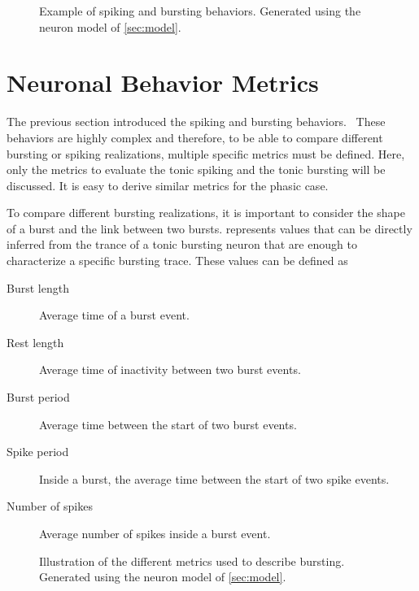 \begin{figure}[htb]
    \centering
    \caption{Example of spiking and bursting behaviors. Generated using the neuron model of \cref{sec:model}.}
    \label{fig:behaviors}
\end{figure}

\section{Neuronal Behavior Metrics}

The previous section introduced the spiking and bursting behaviors. 
These behaviors are highly complex and therefore, to be able to compare different bursting or spiking realizations, multiple specific metrics must be defined.
Here, only the metrics to evaluate the tonic spiking and the tonic bursting will be discussed.
It is easy to derive similar metrics for the phasic case.

To compare different bursting realizations, it is important to consider the shape of a burst and the link between two bursts.
 represents values that can be directly inferred from the trance of a tonic bursting neuron that are enough to characterize a specific bursting trace.
These values can be defined as
\begin{description}
    \item[Burst length] Average time of a burst event.
    \item[Rest length] Average time of inactivity between two burst events.
    \item[Burst period] Average time between the start of two burst events.
    \item[Spike period] Inside a burst, the average time between the start of two spike events.
    \item[Number of spikes] Average number of spikes inside a burst event.
\end{description}

\begin{figure}[htb]
    \centering
    \caption{Illustration of the different metrics used to describe bursting. Generated using the neuron model of \cref{sec:model}.}
    \label{fig:burst_metrics}
\end{figure}

